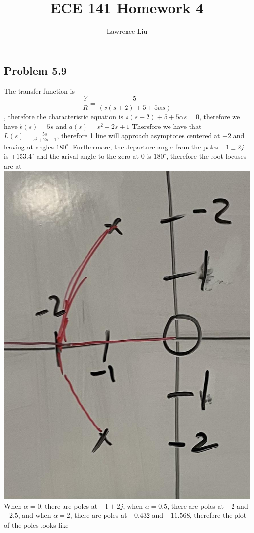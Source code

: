 \documentclass[12pt]{article}
\title{ECE 141 Homework 4}
\author{Lawrence Liu}
\begin{document}
\maketitle
\subsection*{Problem 5.9}
The transfer function is $$\frac{Y}{R}=\frac{5}{(s(s+2)+5+5\alpha s)}$$, therefore the characteristic equation is $s(s+2)+5+5\alpha s=0$, therefore we have $b(s)=5s$ and $a(s)=s^2+2s+1$
Therefore we have that $L(s)=\frac{5s}{s^2+2s+1}$, therefore 1 line will approach asymptotes centered at $-2$ and leaving at angles $180^{\circ}$. Furthermore, the departure angle from the poles
$-1\pm 2j$ is $\mp153.4^{\circ}$ and the arival angle to the zero at 0 is $180^{\circ}$, therefore the root locuses are at 
\\\includegraphics[scale=0.25]{Problem1fig1.jpg}\\
When $\alpha=0$, there are poles at $-1\pm 2j$, when $\alpha=0.5$, there are poles at $-2$ and $-2.5$, and when $\alpha=2$, there are poles at $-0.432$ and $-11.568$, therefore the plot of the poles looks like
\end{document}
